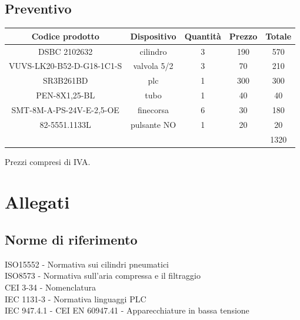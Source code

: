 \documentclass[12pt]{article}
\begin{document}
\subsection{Preventivo}
\begin{table}[H]
	\centering
	\begin{tabular}{|c|c|c|c|c|} \hline
		\rowcolor{ForestGreen!70} Codice prodotto            & Dispositivo & Quantità & Prezzo & Totale \\
		\hline
		\rowcolor{SpringGreen!80} DSBC 2102632               & cilindro    & 3        & 190    & 570    \\
		\hline
		\rowcolor{LimeGreen!80}   VUVS-LK20-B52-D-G18-1C1-S  & valvola 5/2 & 3        & 70     & 210    \\
		\hline
		\rowcolor{SpringGreen!80}   SR3B261BD                & plc         & 1        & 300    & 300    \\
		\hline
		\rowcolor{LimeGreen!80} PEN-8X1,25-BL                & tubo        & 1        & 40     & 40     \\
		\hline
		\rowcolor{SpringGreen!80}   SMT-8M-A-PS-24V-E-2,5-OE & finecorsa   & 6        & 30     & 180    \\
		\hline
		\rowcolor{LimeGreen!80} 82-5551.1133L                & pulsante NO & 1        & 20     & 20     \\
		\hline
		\hline
		\rowcolor{LimeGreen!40}                              &             &          &        & 1320   \\
		\hline
	\end{tabular}
\end{table}
Prezzi compresi di IVA.\\
\newpage
\section{Allegati}
\subsection{Norme di riferimento}
ISO15552 - Normativa sui cilindri pneumatici\\
ISO8573  - Normativa sull'aria compressa e il filtraggio\\
CEI 3-34 - Nomenclatura\\
IEC 1131-3 - Normativa linguaggi PLC\\
IEC 947.4.1 - CEI EN 60947.41 - Apparecchiature in bassa tensione \\
\end{document}

